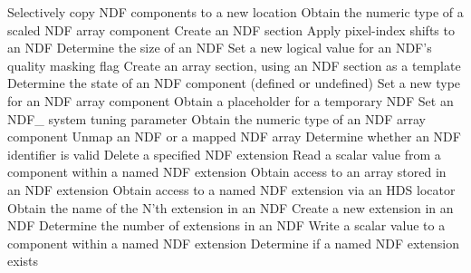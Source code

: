 \begin{latexonly}
            {Selectively copy NDF components to a new location}
            {Obtain the numeric type of a scaled NDF array component}
            {Create an NDF section}
            {Apply pixel-index shifts to an NDF}
            {Determine the size of an NDF}
            {Set a new logical value for an NDF's quality masking flag}
            {Create an array section, using an NDF section as a template}
            {Determine the state of an NDF component (defined or undefined)}
            {Set a new type for an NDF array component}
            {Obtain a placeholder for a temporary NDF}
            {Set an NDF\_ system tuning parameter}
            {Obtain the numeric type of an NDF array component}
            {Unmap an NDF or a mapped NDF array}
            {Determine whether an NDF identifier is valid}
            {Delete a specified NDF extension}
            {Read a scalar value from a component within a named NDF extension}
            {Obtain access to an array stored in an NDF extension}
            {Obtain access to a named NDF extension via an HDS locator}
            {Obtain the name of the N'th extension in an NDF}
            {Create a new extension in an NDF}
            {Determine the number of extensions in an NDF}
            {Write a scalar value to a component within a named NDF extension}
            {Determine if a named NDF extension exists}
\normalsize
\end{latexonly}

